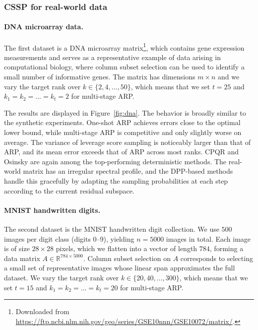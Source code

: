 \documentclass[11pt]{article}
\newcommand{\<}{\langle}
\renewcommand{\>}{\rangle}
\begin{document}
\subsubsection{CSSP for real-world data}
\label{subsec:cssp_real}
\paragraph{DNA microarray data.}
The first dataset is a DNA microarray matrix\footnote{Downloaded from \url{https://ftp.ncbi.nlm.nih.gov/geo/series/GSE10nnn/GSE10072/matrix/}.}, which contains gene expression measurements and serves as a representative example of
data arising in computational biology, where column subset selection can be used to identify
a small number of informative genes. The matrix has dimensions $m \times n$ and we vary the
target rank over $k \in \{2, 4, \ldots, 50\}$, which means that we set $t = 25$ and $k_1 = k_2 = ... = k_t = 2$ for multi-stage ARP.
 
The results are displayed in Figure~\ref{fig:dna}. The behavior is broadly similar to the
synthetic experiments. One-shot ARP achieves errors close to the optimal lower bound, while
multi-stage ARP is competitive and only slightly worse on average. The variance of leverage
score sampling is noticeably larger than that of ARP, and its mean error exceeds that of ARP
across most ranks. CPQR and Osinsky are again among the top-performing deterministic methods.
The real-world matrix has an irregular spectral profile, and the DPP-based methods handle
this gracefully by adapting the sampling probabilities at each step according to the current
residual subspace.

\paragraph{MNIST handwritten digits.}
The second dataset is the MNIST handwritten digit collection. We use $500$ images per digit
class (digits 0--9), yielding $n = 5000$ images in total. Each image is of size $28 \times 28$
pixels, which we flatten into a vector of length $784$, forming a data matrix
$A \in \mathbb{R}^{784 \times 5000}$. Column subset selection on $A$ corresponds to selecting
a small set of representative images whose linear span approximates the full dataset. We vary
the target rank over $k \in \{20, 40, \ldots, 300\}$, which means that we set $t = 15$ and $k_1 = k_2 = ... = k_t = 20$ for multi-stage ARP.
 
\end{document}
